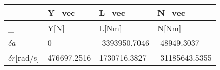 \begin{tabular}{llll}
& Y_vec & L_vec & N_vec \\ 
\hline 
_ & Y[N] & L[Nm] & N[Nm] \\ 
$\delta a$ & 0 & -3393950.7046 & -48949.3037 \\ 
$\delta r$[rad/s] & 476697.2516 & 1730716.3827 & -31185643.5355 \\ 
\hline 
\end{tabular}